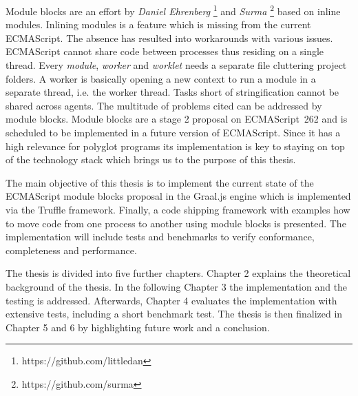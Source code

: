 Module blocks are an effort by \emph{Daniel Ehrenberg} \footnote{https://github.com/littledan} and \emph{Surma} \footnote{https://github.com/surma} based on inline modules. Inlining modules is a feature which is missing from the current ECMAScript. The absence has resulted into workarounds with various issues. ECMAScript cannot share code between processes thus residing on a single thread. Every \emph{module}, \emph{worker} and \emph{worklet} needs a separate file cluttering project folders. A worker is basically opening a new context to run a module in a separate thread, i.e. the worker thread. \cite{workers} Tasks short of stringification cannot be shared across agents. The multitude of problems cited can be addressed by module blocks. Module blocks are a stage 2 proposal on ECMAScript~262 and is scheduled to be implemented in a future version of ECMAScript. \cite{gitMB} Since it has a high relevance for polyglot programs its implementation is key to staying on top of the technology stack which brings us to the purpose of this thesis.

The main objective of this thesis is to implement the current state of the ECMAScript module blocks proposal in the Graal.js engine which is implemented via the Truffle framework. Finally, a code shipping framework with examples how to move code from one process to another using module blocks is presented. The implementation will include tests and benchmarks to verify conformance, completeness and performance.

The thesis is divided into five further chapters. Chapter 2 explains the theoretical background of the thesis. In the following Chapter 3 the implementation and the testing is addressed. Afterwards, Chapter 4 evaluates the implementation with extensive tests, including a short benchmark test. The thesis is then finalized in Chapter 5 and 6 by highlighting future work and a conclusion.



